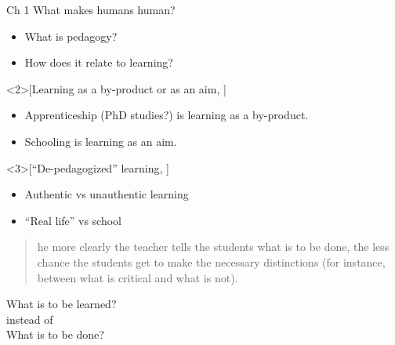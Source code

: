 \begin{frame}
  \begin{block}{Ch 1 What makes humans human?}
    \begin{itemize}
      \item What is pedagogy?
      \item How does it relate to learning?
    \end{itemize}
  \end{block}

  \begin{example}<2>[Learning as a by-product or as an aim, 
    {\cite[pp.~9--10]{NecessaryConditionsOfLearning}}]
    \begin{itemize}
      \item Apprenticeship (PhD studies?) is learning as a by-product.
      \item Schooling is learning as an aim.
    \end{itemize}
  \end{example}

  \begin{example}<3>[\enquote{De-pedagogized} learning, 
    {\cite[pp.~11-12]{NecessaryConditionsOfLearning}}]
    \begin{itemize}
      \item Authentic vs unauthentic learning
      \item \enquote{Real life} vs school
    \end{itemize}
  \end{example}
\end{frame}

\begin{frame}
  \begin{example}
    \blockcquote[p.~13]{NecessaryConditionsOfLearning}{%
      he more clearly the teacher tells the students what is to be 
      done, the less chance the students get to make the necessary distinctions 
      (for instance, between what is critical and what is not).%
    }
  \end{example}
\end{frame}

\begin{frame}
  \begin{center}
    What is to be learned?\\[1em]
    instead of\\[1em]
    What is to be done?
  \end{center}
\end{frame}

